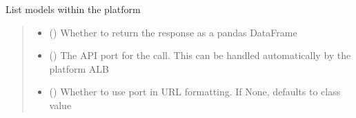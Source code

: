 \documentclass[letterpaper,10pt,english]{sphinxmanual}
\begin{document}
\begin{fulllineitems}
\begin{fulllineitems}
\label{\detokenize{aisquared.platform:aisquared.platform.AISquaredPlatformClient.AISquaredPlatformClient.list_models}}
\pysigstartsignatures
{}
\pysigstopsignatures
\sphinxAtStartPar
List models within the platform

\begin{sphinxVerbatim}[commandchars=\\\{\}]
 
  
\end{sphinxVerbatim}
\begin{quote}\begin{description}
\begin{itemize}
\item {} 
\sphinxAtStartPar
{} (\sphinxstyleliteralemphasis{\sphinxupquote{ (}}\sphinxstyleliteralemphasis{\sphinxupquote{)}}) \textendash{} Whether to return the response as a pandas DataFrame

\item {} 
\sphinxAtStartPar
{} () \textendash{} The API port for the call. This can be handled automatically by the platform ALB

\item {} 
\sphinxAtStartPar
{} (\sphinxstyleliteralemphasis{\sphinxupquote{ (}}\sphinxstyleliteralemphasis{\sphinxupquote{)}}) \textendash{} Whether to use port in URL formatting. If None, defaults to class value


\end{itemize}
\end{description}
\end{quote}
\end{fulllineitems}
\end{fulllineitems}
\end{document}
